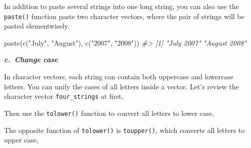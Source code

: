 \documentclass[
]{book}
\newenvironment{Shaded}{\begin{snugshade}}{\end{snugshade}}
\newcommand{\CommentTok}[1]{\textcolor[rgb]{0.56,0.35,0.01}{\textit{#1}}}
\newcommand{\FunctionTok}[1]{\textcolor[rgb]{0.00,0.00,0.00}{#1}}
\newcommand{\NormalTok}[1]{#1}
\newcommand{\OtherTok}[1]{\textcolor[rgb]{0.56,0.35,0.01}{#1}}
\newcommand{\StringTok}[1]{\textcolor[rgb]{0.31,0.60,0.02}{#1}}
\begin{document}
In addition to paste several strings into one long string, you can also use the \texttt{paste()} function paste two character vectors, where the pair of strings will be pasted elementwisely.

\begin{Shaded}
\begin{Highlighting}[]
\FunctionTok{paste}\NormalTok{(}\FunctionTok{c}\NormalTok{(}\StringTok{"July"}\NormalTok{, }\StringTok{"August"}\NormalTok{),  }\FunctionTok{c}\NormalTok{(}\StringTok{"2007"}\NormalTok{, }\StringTok{"2008"}\NormalTok{))}
\CommentTok{\#\textgreater{} [1] "July 2007"   "August 2008"}
\end{Highlighting}
\end{Shaded}

\textbf{\emph{c.~Change case}}

In character vectors, each string can contain both uppercase and lowercase letters. You can unify the cases of all letters inside a vector. Let's review the character vector \texttt{four\_strings} at first,

\begin{Shaded}
\end{Shaded}

Then use the \texttt{tolower()} function to convert all letters to lower case,

\begin{Shaded}
\end{Shaded}

The opposite function of \texttt{tolower()} is \texttt{toupper()}, which converts all letters to upper case,

\begin{Shaded}
\end{Shaded}
\end{document}
